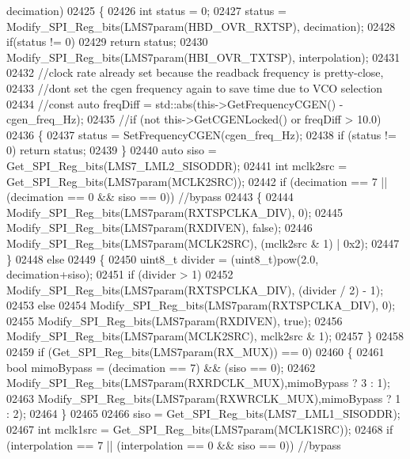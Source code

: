 \begin{DoxyCode}
{{{{{{{{{{{{{{{{{{{{{{{{{{{{{{{{{{{{{{{{{{{{{{{{{{{{{{{{{{{{{{{{      decimation)
02425 \{
02426     \textcolor{keywordtype}{int} status = 0;
02427     status = Modify_SPI_Reg_bits(LMS7param(HBD_OVR_RXTSP), decimation);
02428     \textcolor{keywordflow}{if}(status != 0)
02429         \textcolor{keywordflow}{return} status;
02430     Modify_SPI_Reg_bits(LMS7param(HBI_OVR_TXTSP), interpolation);
02431 
02432     \textcolor{comment}{//clock rate already set because the readback frequency is pretty-close,}
02433     \textcolor{comment}{//dont set the cgen frequency again to save time due to VCO selection}
02434     \textcolor{comment}{//const auto freqDiff = std::abs(this->GetFrequencyCGEN() - cgen\_freq\_Hz);}
02435     \textcolor{comment}{//if (not this->GetCGENLocked() or freqDiff > 10.0)}
02436     \{
02437         status = SetFrequencyCGEN(cgen\_freq\_Hz);
02438         \textcolor{keywordflow}{if} (status != 0) \textcolor{keywordflow}{return} status;
02439     \}
02440     \textcolor{keyword}{auto} siso =  Get_SPI_Reg_bits(LMS7_LML2_SISODDR);
02441     \textcolor{keywordtype}{int} mclk2src = Get_SPI_Reg_bits(LMS7param(MCLK2SRC));
02442     \textcolor{keywordflow}{if} (decimation == 7 || (decimation == 0 && siso == 0)) \textcolor{comment}{//bypass}
02443     \{
02444         Modify_SPI_Reg_bits(LMS7param(RXTSPCLKA_DIV), 0);
02445         Modify_SPI_Reg_bits(LMS7param(RXDIVEN), \textcolor{keyword}{false});
02446         Modify_SPI_Reg_bits(LMS7param(MCLK2SRC), (mclk2src & 1) | 0x2);
02447     \}
02448     \textcolor{keywordflow}{else}
02449     \{
02450         uint8\_t divider = (uint8\_t)pow(2.0, decimation+siso);
02451         \textcolor{keywordflow}{if} (divider > 1)
02452             Modify_SPI_Reg_bits(LMS7param(RXTSPCLKA_DIV), (divider / 2) - 1);
02453         \textcolor{keywordflow}{else}
02454             Modify_SPI_Reg_bits(LMS7param(RXTSPCLKA_DIV), 0);
02455         Modify_SPI_Reg_bits(LMS7param(RXDIVEN), \textcolor{keyword}{true});
02456         Modify_SPI_Reg_bits(LMS7param(MCLK2SRC), mclk2src & 1);
02457     \}
02458 
02459     \textcolor{keywordflow}{if} (Get_SPI_Reg_bits(LMS7param(RX_MUX)) == 0)
02460     \{
02461         \textcolor{keywordtype}{bool} mimoBypass = (decimation == 7) && (siso == 0);
02462         Modify_SPI_Reg_bits(LMS7param(RXRDCLK_MUX),mimoBypass ? 3 : 1);
02463         Modify_SPI_Reg_bits(LMS7param(RXWRCLK_MUX),mimoBypass ? 1 : 2);
02464     \}
02465 
02466     siso =  Get_SPI_Reg_bits(LMS7_LML1_SISODDR);
02467     \textcolor{keywordtype}{int} mclk1src = Get_SPI_Reg_bits(LMS7param(MCLK1SRC));
02468     \textcolor{keywordflow}{if} (interpolation == 7 || (interpolation == 0 && siso == 0)) \textcolor{comment}{//bypass}
}}}}}}}}}}}}}}}}}}}}}}}}}}}}}}}}}}}}}}}}}}}}}}}}}}}}}}}}}}}}}}}}
\end{DoxyCode}
